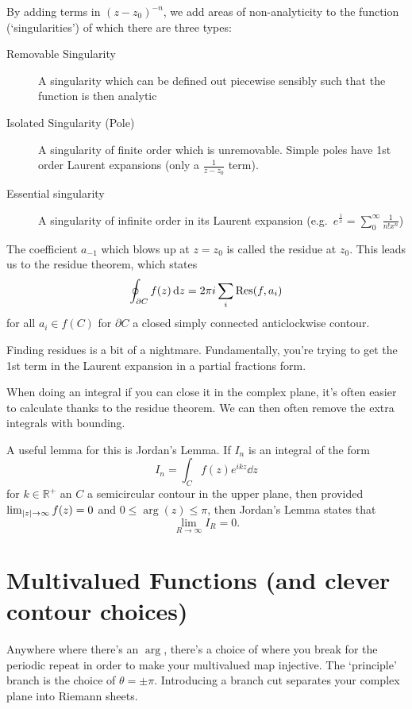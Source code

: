 \documentclass[a4paper,12pt,parskip=full,BCOR=1cm]{scrreprt}
\renewcommand{\leq}{\leqslant}
\begin{document}
By adding terms in $(z-z_0)^{-n}$, we add areas of non-analyticity to the function (`singularities') of which there are three types:
\begin{description}
 \item [Removable Singularity] A singularity which can be defined out piecewise sensibly such that the function is then analytic
 \item [Isolated Singularity (Pole)] A singularity of finite order which is unremovable.
Simple poles have 1st order Laurent expansions (only a $\frac{1}{z-z_0}$ term).
 \item [Essential singularity] A singularity of infinite order in its Laurent expansion (e.g.~$e^{\frac{1}{x}}=\sum_0^\infty \frac{1}{n!x^n}$)
\end{description}

The coefficient $a_{-1}$ which blows up at $z=z_0$ is called the residue at $z_0$.
This leads us to the residue theorem, which states
\begin{equation*}
 \oint_{\partial C} f(z) \dd{z} = 2\pi i \sum_{i}\Res(f,a_i)
\end{equation*}
for all $a_i\in f(C)$ for $\partial C$ a closed simply connected anticlockwise contour.

Finding residues is a bit of a nightmare.
Fundamentally, you're trying to get the 1st term in the Laurent expansion in a partial fractions form.

When doing an integral if you can close it in the complex plane, it's often easier to calculate thanks to the residue theorem.
We can then often remove the extra integrals with bounding.

A useful lemma for this is Jordan's Lemma.
If $I_n$ is an integral of the form $$I_n = \int _C f(z)e^{ikz} \dd{z}$$ for $k\in \mathbb{R^+}$ an $C$ a semicircular contour in the upper plane, then provided $\lim_{\abs{z} \rightarrow \infty}f(z) = 0$ and $0\leq\arg(z)\leq\pi$, then Jordan's Lemma states that $$\lim_{R\rightarrow \infty}I_R = 0.$$

\section{Multivalued Functions (and clever contour choices)}
Anywhere where there's an $\arg$, there's a choice of where you break for the periodic repeat in order to make your multivalued map injective.
The `principle' branch is the choice of $\theta = \pm \pi$.
Introducing a branch cut separates your complex plane into Riemann sheets.
\end{document}
